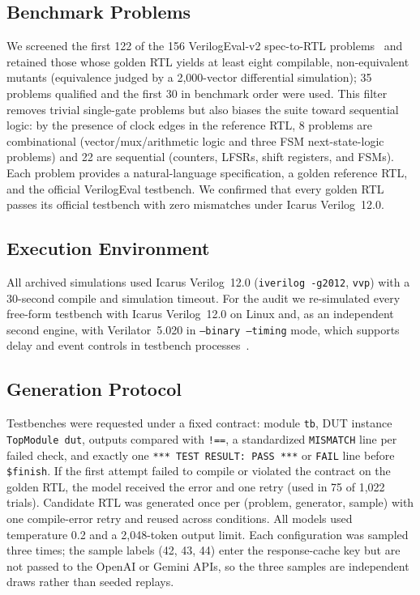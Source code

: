 \documentclass[conference]{IEEEtran}
\begin{document}
\subsection{Benchmark Problems}
We screened the first 122 of the 156 VerilogEval-v2 spec-to-RTL problems~\cite{pinckney2024revisiting} and retained those whose golden RTL yields at least eight compilable, non-equivalent mutants (equivalence judged by a 2,000-vector differential simulation); 35 problems qualified and the first 30 in benchmark order were used. This filter removes trivial single-gate problems but also biases the suite toward sequential logic: by the presence of clock edges in the reference RTL, 8 problems are combinational (vector/mux/arithmetic logic and three FSM next-state-logic problems) and 22 are sequential (counters, LFSRs, shift registers, and FSMs). Each problem provides a natural-language specification, a golden reference RTL, and the official VerilogEval testbench. We confirmed that every golden RTL passes its official testbench with zero mismatches under Icarus Verilog~12.0.

\subsection{Execution Environment}
All archived simulations used Icarus Verilog~12.0 (\texttt{iverilog -g2012}, \texttt{vvp}) with a 30-second compile and simulation timeout. For the audit we re-simulated every free-form testbench with Icarus Verilog~12.0 on Linux and, as an independent second engine, with Verilator~5.020 in \texttt{--binary --timing} mode, which supports delay and event controls in testbench processes~\cite{verilator}.

\subsection{Generation Protocol}
Testbenches were requested under a fixed contract: module \texttt{tb}, DUT instance \texttt{TopModule dut}, outputs compared with \texttt{!==}, a standardized \texttt{MISMATCH} line per failed check, and exactly one \texttt{*** TEST RESULT: PASS ***} or \texttt{FAIL} line before \texttt{\$finish}. If the first attempt failed to compile or violated the contract on the golden RTL, the model received the error and one retry (used in 75 of 1,022 trials). Candidate RTL was generated once per (problem, generator, sample) with one compile-error retry and reused across conditions. All models used temperature 0.2 and a 2,048-token output limit. Each configuration was sampled three times; the sample labels (42, 43, 44) enter the response-cache key but are not passed to the OpenAI or Gemini APIs, so the three samples are independent draws rather than seeded replays.
\end{document}
